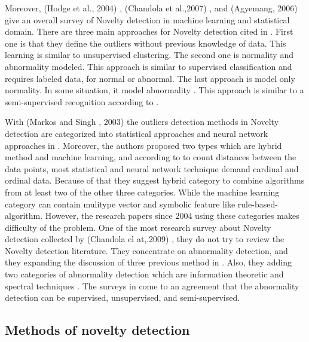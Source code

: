 \documentclass[conference]{IEEEtran}
\begin{document}
\par Moreover, (Hodge et al., 2004) \cite{hodge2004survey}, (Chandola et al.,2007) \cite{chandola2007outlier} , and (Agyemang, 2006) \cite{agyemang2006comprehensive} give an overall survey of Novelty detection in machine learning and statistical domain. There are three main approaches for Novelty detection cited in \cite{hodge2004survey}. First one is that they define the outliers without previous knowledge of data. This learning is similar to unsupervised clustering. The second one is normality and abnormality modeled. This approach is similar to supervised classification and requires labeled data, for normal or abnormal. The last approach is model only normality. In some situation, it model
abnormality \cite{japkowicz1995novelty} \cite{fawcett1999activity}. This approach is similar to a semi-supervised recognition according to \cite{hodge2004survey}.



With (Markos and Singh , 2003) \cite{markou2003novelty} \cite{markou2003novelty}the outliers detection methods in Novelty detection are categorized into statistical approaches  and neural network approaches in \cite{hodge2004survey} \cite{agyemang2006comprehensive}. Moreover, the authors proposed two types which are hybrid method and machine learning, and according to  \cite{hodge2004survey} to count distances between the data points, most statistical  and neural network technique demand cardinal and ordinal data. Because of that they suggest hybrid category to combine algorithms from at least two of the other three categories. While the machine learning category can contain mulitype vector and symbolic feature like rule-based-algorithm. However, the research papers since 2004 using these categories makes difficulty of the problem. 
One of the most research survey about Novelty detection collected by (Chandola el at,.2009) \cite{chandola2009anomaly}, they do not try to review the Novelty detection literature. They concentrate on abnormality detection, and they expanding the discussion of three previous method in  \cite{hodge2004survey}\cite{agyemang2006comprehensive} \cite{chandola2007outlier} . Also, they adding two categories of abnormality detection which are information theoretic and spectral techniques  \cite{chandola2009anomaly}. The surveys in \cite{hodge2004survey}\cite{agyemang2006comprehensive} \cite{chandola2009anomaly} come to an agreement that the abnormality detection can be supervised, unsupervised, and semi-supervised. 


\subsection{ Methods of novelty detection }
\end{document}
